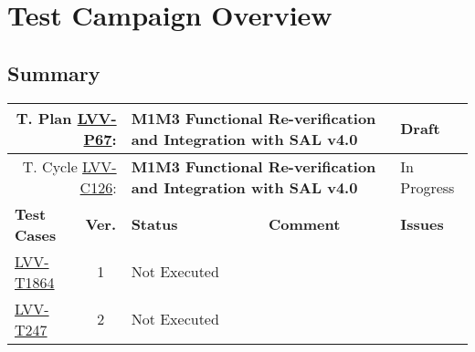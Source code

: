 \documentclass[SE,lsstdraft,STR,toc]{lsstdoc}
\begin{document}
\newpage

\section{Test Campaign Overview}
\label{sect:overview}

\subsection{Summary}
\label{sect:summarytable}

{\small
\begin{longtable}{p{2cm}cp{2.3cm}p{8.6cm}p{2.3cm}}
\toprule
\multicolumn{2}{r}{ T. Plan \href{https://jira.lsstcorp.org/secure/Tests.jspa\#/testPlan/LVV-P67}{LVV-P67}:} &
\multicolumn{2}{p{10.9cm}}{\textbf{ M1M3 Functional Re-verification and Integration with SAL v4.0 }} & Draft \\\hline
\multicolumn{2}{r}{ T. Cycle \href{https://jira.lsstcorp.org/secure/Tests.jspa\#/testCycle/LVV-C126}{LVV-C126}:} &
\multicolumn{2}{p{10.9cm}}{\textbf{ M1M3 Functional Re-verification and Integration with SAL v4.0 }} & In Progress \\\hline
\textbf{Test Cases} &  \textbf{Ver.} & \textbf{Status} & \textbf{Comment} & \textbf{Issues} \\\toprule
\href{https://jira.lsstcorp.org/secure/Tests.jspa#/testCase/LVV-T1864}{LVV-T1864}
&  1
& Not Executed &
\begin{minipage}[]{9cm}
\smallskip

\medskip
\end{minipage}
&
\\\hline
\href{https://jira.lsstcorp.org/secure/Tests.jspa#/testCase/LVV-T247}{LVV-T247}
&  2
& Not Executed &
\begin{minipage}[]{9cm}
\smallskip


\end{minipage}
\end{longtable}}
\end{document}
